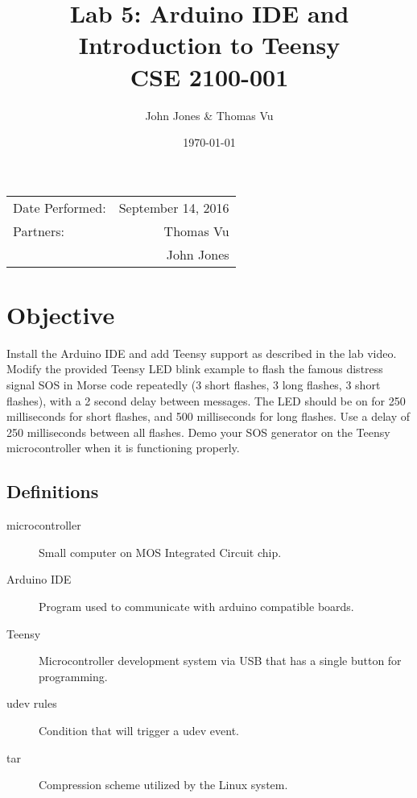 \documentclass{article}
\title{Lab 5: Arduino IDE and Introduction to Teensy \\ CSE 2100-001} %
\author{John Jones & Thomas Vu} %
\date{\today} %
\begin{document}
\maketitle %

\begin{center}
\begin{tabular}{l r}
Date Performed: & September 14, 2016 \\ %
Partners: & Thomas Vu \\ %
& John Jones \\
\end{tabular}
\end{center}



\section{Objective}

Install the Arduino IDE and add Teensy support as described in the lab video. Modify the provided Teensy LED blink example to flash the famous distress signal SOS in Morse code repeatedly (3 short flashes, 3 long flashes, 3 short flashes), with a 2 second delay between messages. The LED should be on for 250 milliseconds for short flashes, and 500 milliseconds for long flashes. Use a delay of 250 milliseconds between all flashes. Demo your SOS generator on the Teensy microcontroller when it is functioning properly.

\subsection{Definitions}
\label{definitions}
\begin{description}
\item[microcontroller]
Small computer on MOS Integrated Circuit chip. 
\item[Arduino IDE]
Program used to communicate with arduino compatible boards.
\item[Teensy]
Microcontroller development system via USB that has a single button for programming.
\item[udev rules]
Condition that will trigger a udev event.
\item[tar]
Compression scheme utilized by the Linux system.
\end{description} 
 
\end{document}
